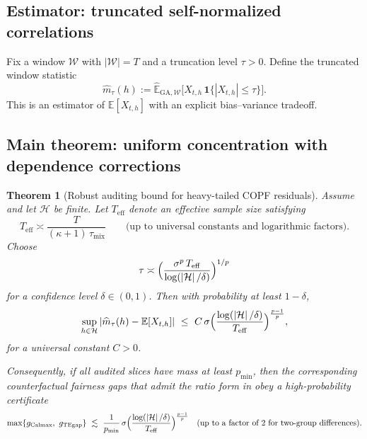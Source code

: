 \documentclass[11pt]{article}
\newcommand{\E}{\mathbb{E}}
\newcommand{\1}{\mathbf{1}}
\newcommand{\cH}{\mathcal{H}}
\newcommand{\cW}{\mathcal{W}}
\newcommand{\abs}[1]{\left|#1\right|}
\newcommand{\Eb}{\widehat{\mathbb{E}}} %
\theoremstyle{plain}
\newtheorem{theorem}{Theorem}[section]
\theoremstyle{definition}
\theoremstyle{remark}
\begin{document}
\subsection{Estimator: truncated self-normalized correlations}
Fix a window $\cW$ with $|\cW|=T$ and a truncation level $\tau>0$.
Define the truncated window statistic
\[
\widehat m_{\tau}(h)
:= \Eb_{\mathrm{GA},\cW}\bigl[X_{t,h}\,\1\{\abs{X_{t,h}}\le \tau\}\bigr].
\]
This is an estimator of $\E[X_{t,h}]$ with an explicit bias--variance tradeoff.

\subsection{Main theorem: uniform concentration with dependence corrections}
\begin{theorem}[Robust auditing bound for heavy-tailed COPF residuals]\label{thm:robust}
Assume  and let $\cH$ be finite.
Let $T_{\mathrm{eff}}$ denote an effective sample size satisfying
\begin{equation}
\label{eq:teff}
T_{\mathrm{eff}} \asymp \frac{T}{(\kappa+1)\,\tau_{\mathrm{mix}}}
\qquad\text{(up to universal constants and logarithmic factors).}
\end{equation}
Choose
\begin{equation}
\label{eq:tauchoice}
\tau \asymp \Bigl(\frac{\sigma^p\,T_{\mathrm{eff}}}{\log(\abs{\cH}/\delta)}\Bigr)^{1/p}
\end{equation}
for a confidence level $\delta\in(0,1)$.
Then with probability at least $1-\delta$,
\[
\sup_{h\in\cH}\abs{\widehat m_{\tau}(h)-\E[X_{t,h}]}
\ \le\ C\,\sigma\Bigl(\frac{\log(\abs{\cH}/\delta)}{T_{\mathrm{eff}}}\Bigr)^{\frac{p-1}{p}},
\]
for a universal constant $C>0$.

Consequently, if all audited slices have mass at least $p_{\min}$,
then the corresponding counterfactual fairness gaps that admit the ratio form in 
obey a high-probability certificate
\[
\max\{g_{\mathrm{Calmax}},\ g_{\mathrm{TEgap}}\}
\ \lesssim\ \frac{1}{p_{\min}}\,\sigma\Bigl(\frac{\log(\abs{\cH}/\delta)}{T_{\mathrm{eff}}}\Bigr)^{\frac{p-1}{p}}
\quad\text{(up to a factor of $2$ for two-group differences).}
\]
\end{theorem}
\end{document}

